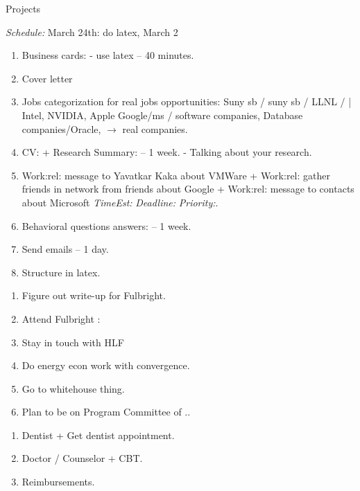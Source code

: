 \documentclass[serif, mathserif, final]{beamer}
\newcommand{\te}[1]{\textit{TimeEst:}\textit{#1}}
\newcommand{\dl}[1]{\textit{Deadline:}\textit{#1}}
\newcommand{\pr}[1]{\textit{Priority:}\textit{#1}}
\begin{document}
\begin{frame}
\begin{columns}
\begin{column}{0.5\textwidth}
\begin{block}{Projects}
\begin{enumerate}
\end{enumerate} 
\textit{Schedule:} March 24th: do latex, March 2 \\
\begin{enumerate} 
\tiny \item \tiny Business cards:  - use latex  -- 40 minutes. 
\item \tiny Cover letter 
\item \tiny Jobs categorization for real jobs opportunities: 
Suny sb / suny sb / LLNL /  |  Intel, NVIDIA, Apple  Google/ms /
software companies, Database companies/Oracle, $\rightarrow$ real
companies. 
\item \tiny CV: + Research Summary:  -- 1 week.  - Talking about your research.
\item \tiny Work:rel: message to Yavatkar Kaka about VMWare +
  Work:rel: gather friends in network from friends about Google + Work:rel: message to contacts about Microsoft \te{} \dl{} \pr{}. 
\item \tiny Behavioral questions answers:    -- 1 week. 
\item \tiny Send emails – 1 day. 
\item \tiny Structure in latex. 
\end{enumerate}
\begin{enumerate} 
\tiny \item \tiny Figure out write-up for Fulbright. 
\item \tiny Attend Fulbright : 
\item \tiny Stay in touch with HLF 
\item \tiny Do energy econ work with convergence. 
\item \tiny Go to whitehouse thing. 
\item \tiny Plan to be on Program Committee of .. 
\end{enumerate}
\begin{enumerate}
\tiny \item \tiny Dentist + Get dentist appointment.
\item \tiny Doctor / Counselor + CBT.
\item \tiny Reimbursements.

\end{enumerate}
\end{block}
\end{column}
\end{columns}
\end{frame}
\end{document}
